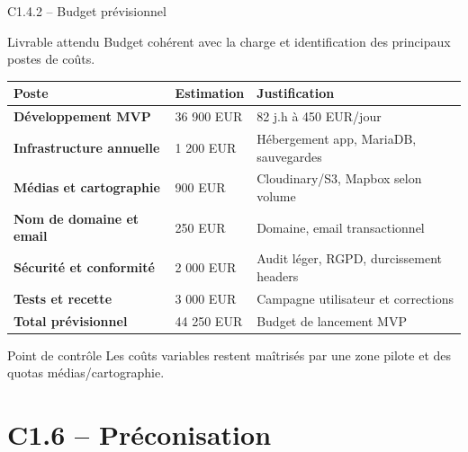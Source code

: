 \documentclass[aspectratio=169,11pt]{beamer}
\newcommand{\competence}[2]{%
  \begin{block}{#1}
    #2
  \end{block}
}
\begin{document}
\begin{frame}[shrink=6]{C1.4.2 -- Budget prévisionnel}
  \competence{Livrable attendu}{Budget cohérent avec la charge et identification des principaux postes de coûts.}
  \small
  \begin{tabularx}{\textwidth}{>{\bfseries}p{3.4cm} p{2.2cm} X}
    Poste & Estimation & Justification \\
    \hline
    Développement MVP & 36 900 EUR & 82 j.h à 450 EUR/jour \\
    Infrastructure annuelle & 1 200 EUR & Hébergement app, MariaDB, sauvegardes \\
    Médias et cartographie & 900 EUR & Cloudinary/S3, Mapbox selon volume \\
    Nom de domaine et email & 250 EUR & Domaine, email transactionnel \\
    Sécurité et conformité & 2 000 EUR & Audit léger, RGPD, durcissement headers \\
    Tests et recette & 3 000 EUR & Campagne utilisateur et corrections \\
    \hline
    Total prévisionnel & 44 250 EUR & Budget de lancement MVP \\
  \end{tabularx}
  \vspace{0.2cm}
  \begin{block}{Point de contrôle}
    Les coûts variables restent maîtrisés par une zone pilote et des quotas médias/cartographie.
  \end{block}
\end{frame}

\section{C1.6 -- Préconisation}
\end{document}
